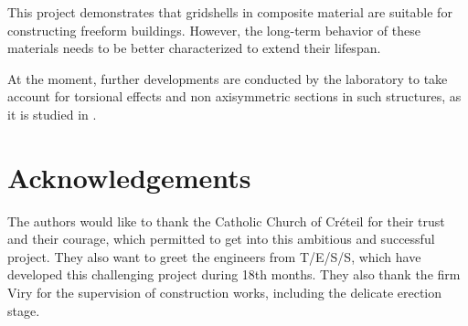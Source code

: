 This project demonstrates that gridshells in composite material are suitable for constructing freeform buildings. However, the long-term behavior of these materials needs to be better characterized to extend their lifespan.

At the moment, further developments are conducted by the laboratory to take account for torsional effects and non axisymmetric sections in such structures, as it is studied in \citep{Barnes2013}.

\section{Acknowledgements}
The authors would like to thank the Catholic Church of Créteil for their trust and their courage, which permitted to get into this ambitious and successful project. They also want to greet the engineers from T/E/S/S, which have developed this challenging project during 18th months. They also thank the firm Viry for the supervision of construction works, including the delicate erection stage.

\clearpage

%
%



